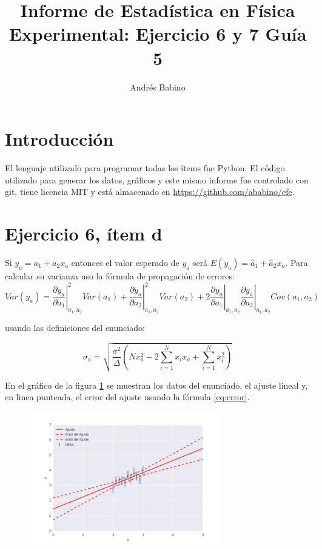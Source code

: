 \title{Informe de Estadística en Física Experimental: Ejercicio 6 y 7 Guía 5}
\author{Andr\'es Babino}


\maketitle
\section{Introducción}
El lenguaje utilizado para programar todas los ítems fue Python.
El código utilizado para generar los datos, gráficos y este mismo informe fue controlado con git, tiene licencia MIT y está almacenado en \url{https://github.com/ababino/efe}.

\section*{Ejercicio 6, ítem d}
Si $y_a=a_1 + a_2 x_a$ entonces el valor esperado de $y_a$ será $E(y_a)=\hat a_1 + \hat a_2 x_a$.
Para calcular su varianza uso la fórmula de propagación de errores:
\begin{equation}
Var(y_a) = \left. \frac{\partial y_a}{\partial a_1}\right|_{\hat a_1, \hat a_2}^2 Var(a_1) + \left. \frac{\partial y_a}{\partial a_2}\right|_{\hat a_1, \hat a_2}^2 Var(a_2) + 2 \left. \frac{\partial y_a}{\partial a_1}\right|_{\hat a_1, \hat a_2} \left. \frac{\partial y_a}{\partial a_2}\right|_{\hat a_1, \hat a_2} Cov(a_1, a_2)
\label{eq:prop}
\end{equation}

usando las definiciones del enunciado:

\begin{equation}
\sigma_a = \sqrt{\frac{\sigma^2}{\Delta} \left(N x_a^2 -2 \sum_{i=1}^N x_i x_a +\sum_{i=1}^N x_i^2\right)}
\label{eq:error}
\end{equation}

En el gráfico de la figura \ref{fig:e6d} se muestran los datos del enunciado, el ajuste lineal y, en linea punteada, el error del ajuste usando la fórmula \ref{eq:error}.

\begin{figure}
\centering
\includegraphics[width=0.75\textwidth]{ej6d.jpg}
\caption[]{}
\label{fig:e6d}
\end{figure}

